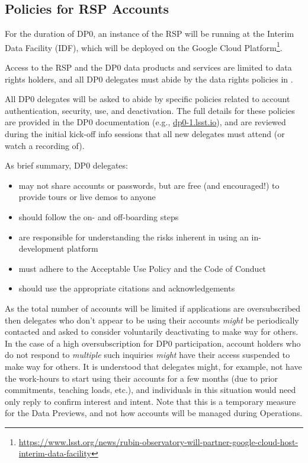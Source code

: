 \documentclass[DM,lsstdraft,authoryear,toc]{lsstdoc}
\begin{document}
\subsection{Policies for RSP Accounts}\label{ssec:res_pol}

For the duration of DP0, an instance of the RSP will be running at the Interim Data Facility (IDF), which will be deployed on the Google Cloud Platform\footnote{\url{https://www.lsst.org/news/rubin-observatory-will-partner-google-cloud-host-interim-data-facility}}.

Access to the RSP and the DP0 data products and services are limited to data rights holders, and all DP0 delegates must abide by the data rights policies in .

All DP0 delegates will be asked to abide by specific policies related to account authentication, security, use, and deactivation.
The full details for these policies are provided in the DP0 documentation (e.g., \url{dp0-1.lsst.io}), and are reviewed during the initial kick-off info sessions that all new delegates must attend (or watch a recording of).

As brief summary, DP0 delegates:
\begin{itemize}
\item may not share accounts or passwords, but are free (and encouraged!) to provide tours or live demos to anyone
\item should follow the on- and off-boarding steps
\item are responsible for understanding the risks inherent in using an in-development platform
\item must adhere to the Acceptable Use Policy and the Code of Conduct
\item should use the appropriate citations and acknowledgements
\end{itemize}

As the total number of accounts will be limited if applications are oversubscribed then delegates who don't appear to be using their accounts {\it might} be periodically contacted and asked to consider voluntarily deactivating to make way for others.
In the case of a high oversubscription for DP0 participation, account holders who do not respond to \emph{multiple} such inquiries \emph{might} have their access suspended to make way for others.
It is understood that delegates might, for example, not have the work-hours to start using their accounts for a few months (due to prior commitments, teaching loads, etc.), and individuals in this situation would need only reply to confirm interest and intent. 
Note that this is a temporary measure for the Data Previews, and not how accounts will be managed during Operations.
\end{document}
